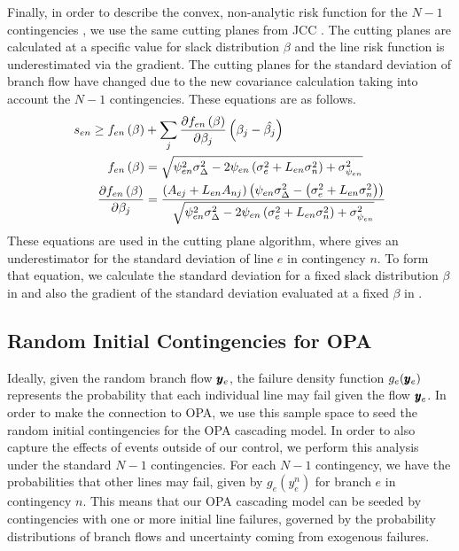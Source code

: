 Finally, in order to describe the convex, non-analytic risk function for the $N-1$ contingencies , we use the same cutting planes from JCC .  The cutting planes are calculated at a specific value for slack distribution $\beta$ and the line risk function is underestimated via the gradient.  The cutting planes for the standard deviation of branch flow have changed due to the new covariance calculation taking into account the $N-1$ contingencies.  These equations are as follows.
\begin{subequations}\label{sd-cuts}
\begin{align}
s_{en} \geq f_{en}\left(\beta\right) &+ \sum_j \frac{\partial f_{en}\left(\beta \right)}{\partial \beta_j} \left( \beta_j - \hat{\beta_j} \right) \label{sd-cut}\\
f_{en}\left(\beta\right) &= \sqrt{ \psi_{en}^2 \sigma_\Delta^2 - 2 \psi_{en} \left( \sigma^2_e + L_{en} \sigma^2_n \right) + \sigma^2_{\psi_{en}}} \label{sd-calc}\\
  \frac{\partial f_{en}\left(\beta \right)}{\partial \beta_j} &= \frac{\left(A_{ej} + L_{en}A_{nj}\right) \left( \psi_{en} \sigma_\Delta^2 - \left(\sigma^2_e + L_{en} \sigma^2_n \right) \right)}{\sqrt{\psi_{en}^2 \sigma_\Delta^2 - 2 \psi_{en} \left(\sigma^2_e  + L_{en}\sigma^2_n \right) + \sigma^2_{\psi_{en}} }} \label{sd-deriv}
\end{align}
\end{subequations}
These equations are used in the cutting plane algorithm, where   gives an underestimator for the standard deviation of line $e$ in contingency $n$.  To form that equation, we calculate the standard deviation for a fixed slack distribution $\beta$ in  and also the gradient of the standard deviation evaluated at a fixed $\beta$ in .




\subsection{Random Initial Contingencies for OPA}
Ideally, given the random branch flow $\pmb{y}_e$, the failure density function $g_e(\pmb{y}_e)$ represents the probability that each individual line may fail given the  flow $\pmb{y}_e$.  In order to make the connection to OPA, we use this sample space to seed the random initial contingencies for the OPA cascading model.  In order to also capture the effects of events outside of our control, we perform this analysis under the standard $N-1$ contingencies.  For each $N-1$ contingency, we have the probabilities that other lines may fail, given by $g_e(y_e^n)$ for branch $e$ in contingency $n$.  This means that our OPA cascading model can be seeded by contingencies with one or more initial line failures, governed by the probability distributions of branch flows and uncertainty coming from exogenous failures.  

